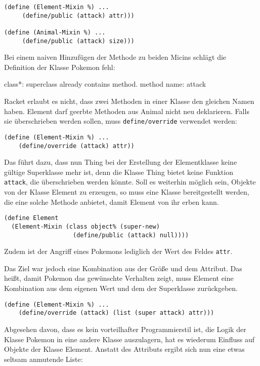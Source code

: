 \begin{lstlisting}
(define (Element-Mixin %) ...
     (define/public (attack) attr)))

(define (Animal-Mixin %) ...
     (define/public (attack) size)))
\end{lstlisting}

Bei einem naiven Hinzufügen der Methode zu beiden Micins schlägt die Definition der Klasse Pokemon fehl:

{\rerror class*: superclass already contains method. method name: attack}

Racket erlaubt es nicht, dass zwei Methoden in einer Klasse den gleichen Namen haben. Element darf geerbte Methoden aus Animal nicht neu deklarieren. Falls sie überschrieben werden sollen, muss \texttt{define/override} verwendet werden:

\begin{lstlisting}
(define (Element-Mixin %) ...
    (define/override (attack) attr))
\end{lstlisting}

Das führt dazu, dass nun Thing bei der Erstellung der Elementklasse keine gültige Superklasse mehr ist, denn die Klasse Thing bietet keine Funktion \texttt{attack}, die überschrieben werden könnte. Soll es weiterhin möglich sein, Objekte von der Klasse Element zu erzeugen, so muss eine Klasse bereitgestellt werden, die eine solche Methode anbietet, damit Element von ihr erben kann.

\begin{lstlisting}
(define Element 
  (Element-Mixin (class object% (super-new)
                   (define/public (attack) null))))
\end{lstlisting}

Zudem ist der Angriff eines Pokemons lediglich der Wert des Feldes \texttt{attr}. 

Das Ziel war jedoch eine Kombination aus der Größe und dem Attribut. Das heißt, damit Pokemon das gewünschte Verhalten zeigt, muss Element eine Kombination aus dem eigenen Wert und dem der Superklasse zurückgeben.

\begin{lstlisting}
(define (Element-Mixin %) ...
    (define/override (attack) (list (super attack) attr)))
\end{lstlisting}

Abgesehen davon, dass es kein vorteilhafter Programmierstil ist, die Logik der Klasse Pokemon in eine andere Klasse auszulagern, hat es wiederum Einfluss auf Objekte der Klasse Element. Anstatt des Attributs ergibt sich nun eine etwas seltsam anmutende Liste:

